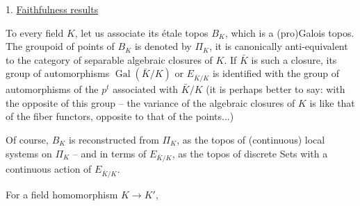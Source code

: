 1. \uline{Faithfulness results}

To every field $K$, let us associate its étale topos $B_K$, which is a (pro)Galois topos. The groupoid of points of $B_K$ is denoted by $\Pi_K$, it is canonically anti-equivalent to the category of separable algebraic closures of $K$. If $\bar K$ is such a closure, its group of automorphisms $\operatorname{Gal}(\bar K/K)$ or $E_{\bar K/K}$ is identified with the group of automorphisms of the $p^t$  associated with $\bar K/K$ (it is perhaps better to say: with the opposite of this group --  the variance of the algebraic closures of $K$ is like that of the fiber functors, opposite to that of the points...)

Of course, $B_K$ is reconstructed from $\Pi_K$, as the topos of (continuous) local systems on $\Pi_K$ -- and in terms of $E_{\bar K/K}$, as the topos of discrete Sets with a continuous action of $E_{\bar K/K}$.

For a field homomorphism $K\longrightarrow K'$,
